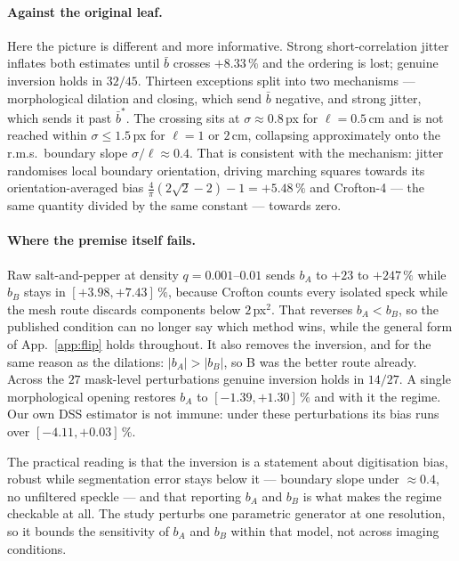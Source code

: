 \documentclass{article}
\newcommand{\pct}[1]{$#1\,\%$}
\begin{document}
\paragraph{Against the original leaf.} Here the picture is different and more informative. Strong
short-correlation jitter inflates both estimates until $\bar b$ crosses \pct{+8.33} and the
ordering is lost; genuine inversion holds in $32/45$. Thirteen exceptions split into two
mechanisms --- morphological dilation and closing, which send $\bar b$ negative, and strong jitter,
which sends it past $\bar b^{*}$. The crossing sits at $\sigma \approx 0.8$\,px for
$\ell = 0.5$\,cm and is not reached within $\sigma \le 1.5$\,px for $\ell = 1$ or $2$\,cm,
collapsing approximately onto the r.m.s.\ boundary slope $\sigma/\ell \approx 0.4$. That is
consistent with the mechanism: jitter randomises local boundary orientation, driving marching
squares towards its orientation-averaged bias $\frac{4}{\pi}(2\sqrt2-2)-1 = +5.48\,\%$ and
Crofton-4 --- the same quantity divided by the same constant --- towards zero.

\paragraph{Where the premise itself fails.} Raw salt-and-pepper at density
$q = 0.001$--$0.01$ sends $b_A$ to $+23$ to $+247\,\%$ while $b_B$ stays in $[+3.98, +7.43]\,\%$,
because Crofton counts every isolated speck while the mesh route discards components below
$2$\,px$^2$. That reverses $b_A < b_B$, so the published condition can no longer say which method
wins, while the general form of App.~\ref{app:flip} holds throughout. It also removes the
inversion, and for the same reason as the dilations: $|b_A| > |b_B|$, so B was the better route
already. Across the $27$ mask-level perturbations genuine inversion holds in $14/27$. A single
morphological opening restores $b_A$ to $[-1.39, +1.30]\,\%$ and with it the regime. Our own DSS
estimator is not immune: under these perturbations its bias runs over $[-4.11, +0.03]\,\%$.

The practical reading is that the inversion is a statement about digitisation bias, robust while
segmentation error stays below it --- boundary slope under $\approx 0.4$, no unfiltered
speckle --- and that reporting $b_A$ and $b_B$ is what makes the regime checkable at all. The study
perturbs one parametric generator at one resolution, so it bounds the sensitivity of $b_A$ and
$b_B$ within that model, not across imaging conditions.
\end{document}

